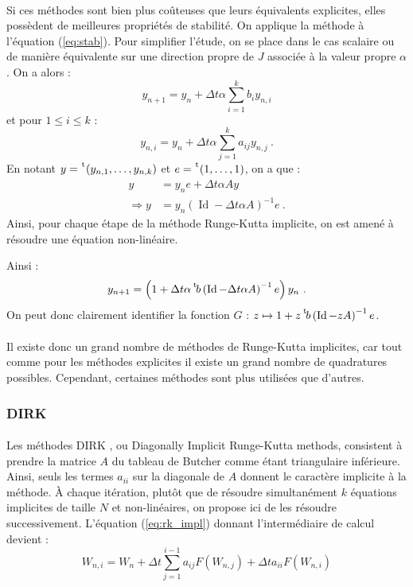     \paragraph{}
    Si ces méthodes sont bien plus coûteuses que leurs équivalents explicites, elles possèdent de meilleures propriétés de stabilité.
    On applique la méthode à l'équation (\ref{eq:stab}).
    Pour simplifier l'étude, on se place dans le cas scalaire ou de manière équivalente sur une direction propre de $J$ associée à la valeur propre $\alpha$.
    On a alors :
    \[y_{n+1} = y_n + \Delta t\alpha \sum_{i = 1}^k b_iy_{n,i}\]
    et pour $1\leq i\leq k$ :
    \[y_{n,i} = y_n + \Delta t\alpha \sum_{j = 1}^k a_{ij}y_{n,j}\ .\]
    En notant $y = \mskip1mu\prescript{\smash{\mathrm t\mkern-3mu}}{}{\mathstrut\left(y_{n,1}, \dots, y_{n,k}\right)}$ et $e = \mskip1mu\prescript{\smash{\mathrm t\mkern-3mu}}{}{\mathstrut\left(1, \dots, 1\right)}$, on a que :
    \begin{align*}
      y &= y_ne + \Delta t\alpha Ay \\
      \Rightarrow y &= y_n\left(\operatorname{Id} - \Delta t\alpha A\right)^{-1}e\ .
    \end{align*}    Ainsi, pour chaque étape de la méthode Runge-Kutta implicite, on est amené à résoudre une équation non-linéaire.

    Ainsi :
    \[y_{n+1} = \left(1 + \Delta t\alpha\mskip1mu\prescript{\smash{\mathrm t\mkern-3mu}}{}{\mathstrut b}\left(\operatorname{Id} - \Delta t\alpha A\right)^{-1}e\right)y_n\ .\]
    On peut donc clairement identifier la fonction $G$ : $z \mapsto 1 + z\mskip1mu\prescript{\smash{\mathrm t\mkern-3mu}}{}{\mathstrut b}\left(\operatorname{Id} - zA\right)^{-1}e$.

    \paragraph{}
    Il existe donc un grand nombre de méthodes de Runge-Kutta implicites, car tout comme pour les méthodes explicites il existe un grand nombre de quadratures possibles.
    Cependant, certaines méthodes sont plus utilisées que d'autres.

    \subsubsection{DIRK}

      \paragraph{}
      Les méthodes DIRK \cite{Alexander1977}, ou Diagonally Implicit Runge-Kutta methods, consistent à prendre la matrice $A$ du tableau de Butcher comme étant triangulaire inférieure.
      Ainsi, seuls les termes $a_{ii}$ sur la diagonale de $A$ donnent le caractère implicite à la méthode.
      À chaque itération, plutôt que de résoudre simultanément $k$ équations implicites de taille $N$ et non-linéaires, on propose ici de les résoudre successivement.
      L'équation (\ref{eq:rk_impl}) donnant l'intermédiaire de calcul devient :
      \begin{equation}\label{eq:rk_dirk}
        W_{n,i} = W_n + \Delta t\sum_{j = 1}^{i-1}a_{ij}F\left(W_{n,j}\right) + \Delta ta_{ii}F\left(W_{n,i}\right)
      \end{equation}

